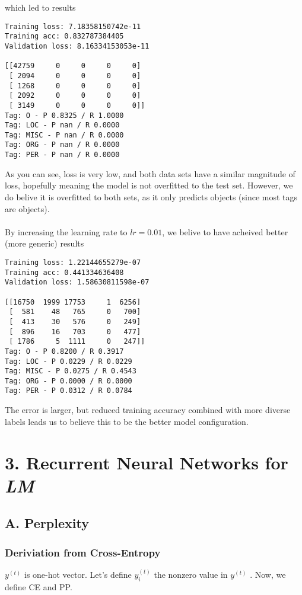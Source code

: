 \documentclass{article}
\begin{document}
which led to results

\begin{lstlisting}
Training loss: 7.18358150742e-11
Training acc: 0.832787384405
Validation loss: 8.16334153053e-11

[[42759     0     0     0     0]
 [ 2094     0     0     0     0]
 [ 1268     0     0     0     0]
 [ 2092     0     0     0     0]
 [ 3149     0     0     0     0]]
Tag: O - P 0.8325 / R 1.0000
Tag: LOC - P nan / R 0.0000
Tag: MISC - P nan / R 0.0000
Tag: ORG - P nan / R 0.0000
Tag: PER - P nan / R 0.0000
\end{lstlisting}

As you can see, loss is very low, and both data sets have a similar magnitude of loss, hopefully meaning the model is not overfitted to the test set. However, we do belive it is overfitted to both sets, as it only predicts objects (since most tags are objects). \\~\\
By increasing the learning rate to $lr=0.01$, we belive to have acheived better (more generic) results
\begin{lstlisting}
Training loss: 1.22144655279e-07
Training acc: 0.441334636408
Validation loss: 1.58630811598e-07

[[16750  1999 17753     1  6256]
 [  581    48   765     0   700]
 [  413    30   576     0   249]
 [  896    16   703     0   477]
 [ 1786     5  1111     0   247]]
Tag: O - P 0.8200 / R 0.3917
Tag: LOC - P 0.0229 / R 0.0229
Tag: MISC - P 0.0275 / R 0.4543
Tag: ORG - P 0.0000 / R 0.0000
Tag: PER - P 0.0312 / R 0.0784
\end{lstlisting}
 
The error is larger, but reduced training accuracy combined with more diverse labels leads us to believe this to be the better model configuration.

\section*{3. Recurrent Neural Networks for \emph{LM}}
\subsection*{A. Perplexity}
\subsubsection*{Deriviation from Cross-Entropy}

\(y^{(t)}\)  is one-hot vector. Let's define \(y_i^{(t)}\) the nonzero value in \(y^{(t)}\) . Now, we define CE and PP.
\end{document}
